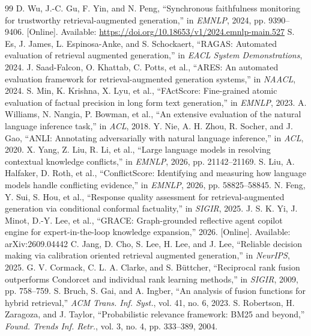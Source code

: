 \documentclass[preprint,3p,times]{elsarticle}
\begin{document}
\begin{thebibliography}{99}
 D. Wu, J.-C. Gu, F. Yin, and N. Peng, ``Synchronous faithfulness monitoring for trustworthy retrieval-augmented generation,'' in \emph{EMNLP}, 2024, pp. 9390--9406. [Online]. Available: \url{https://doi.org/10.18653/v1/2024.emnlp-main.527}
 S. Es, J. James, L. Espinosa-Anke, and S. Schockaert, ``RAGAS: Automated evaluation of retrieval augmented generation,'' in \emph{EACL System Demonstrations}, 2024.
 J. Saad-Falcon, O. Khattab, C. Potts, et al., ``ARES: An automated evaluation framework for retrieval-augmented generation systems,'' in \emph{NAACL}, 2024.
 S. Min, K. Krishna, X. Lyu, et al., ``FActScore: Fine-grained atomic evaluation of factual precision in long form text generation,'' in \emph{EMNLP}, 2023.
 A. Williams, N. Nangia, P. Bowman, et al., ``An extensive evaluation of the natural language inference task,'' in \emph{ACL}, 2018.
 Y. Nie, A. H. Zhou, R. Socher, and J. Gao, ``ANLI: Annotating adversarially with natural language inference,'' in \emph{ACL}, 2020.
 X. Yang, Z. Liu, R. Li, et al., ``Large language models in resolving contextual knowledge conflicts,'' in \emph{EMNLP}, 2026, pp. 21142--21169.
 S. Liu, A. Halfaker, D. Roth, et al., ``ConflictScore: Identifying and measuring how language models handle conflicting evidence,'' in \emph{EMNLP}, 2026, pp. 58825--58845.
 N. Feng, Y. Sui, S. Hou, et al., ``Response quality assessment for retrieval-augmented generation via conditional conformal factuality,'' in \emph{SIGIR}, 2025.
 J. S. K. Yi, J. Minot, D.-Y. Lee, et al., ``GRACE: Graph-grounded reflective agent copilot engine for expert-in-the-loop knowledge expansion,'' 2026. [Online]. Available: arXiv:2609.04442
 C. Jang, D. Cho, S. Lee, H. Lee, and J. Lee, ``Reliable decision making via calibration oriented retrieval augmented generation,'' in \emph{NeurIPS}, 2025.
 G. V. Cormack, C. L. A. Clarke, and S. B\"uttcher, ``Reciprocal rank fusion outperforms Condorcet and individual rank learning methods,'' in \emph{SIGIR}, 2009, pp. 758--759.
 S. Bruch, S. Gai, and A. Ingber, ``An analysis of fusion functions for hybrid retrieval,'' \emph{ACM Trans. Inf. Syst.}, vol. 41, no. 6, 2023.
 S. Robertson, H. Zaragoza, and J. Taylor, ``Probabilistic relevance framework: BM25 and beyond,'' \emph{Found. Trends Inf. Retr.}, vol. 3, no. 4, pp. 333--389, 2004.

\end{thebibliography}
\end{document}
